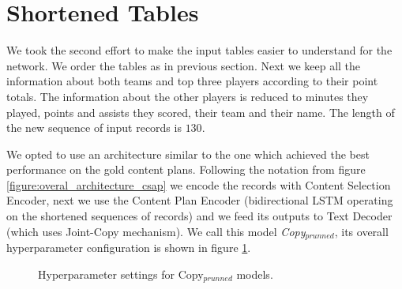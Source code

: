\section{Shortened Tables} \label{section:shortened_tables}

We took the second effort to make the input tables easier to understand for the network. We order the tables as in previous section. Next we keep all the information about both teams and top three players according to their point totals. The information about the other players is reduced to minutes they played, points and assists they scored, their team and their name. The length of the new sequence of input records is $130$.

We opted to use an architecture similar to the one which achieved the best performance on the gold content plans. Following the notation from figure \ref{figure:overal_architecture_csap} we encode the records with Content Selection Encoder, next we use the Content Plan Encoder (bidirectional LSTM operating on the shortened sequences of records) and we feed its outputs to Text Decoder (which uses Joint-Copy mechanism). We call this model \emph{Copy$_{prunned}$}, its overall hyperparameter configuration is shown in figure \ref{figure:hyperparameters_copy_prunned}.

\begin{figure}[h]
    \caption{Hyperparameter settings for Copy$_{prunned}$ models.} \label{figure:hyperparameters_copy_prunned}
\end{figure}


